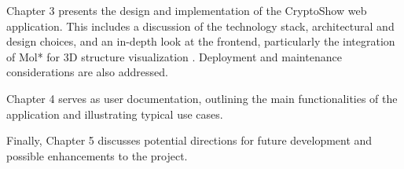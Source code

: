 Chapter 3 presents the design and implementation of the CryptoShow web application. This includes a discussion of the technology stack, architectural and design choices, and an in-depth look at the frontend, particularly the integration of Mol* for 3D structure visualization \cite{sehnal2021mol}. Deployment and maintenance considerations are also addressed.

Chapter 4 serves as user documentation, outlining the main functionalities of the application and illustrating typical use cases.

Finally, Chapter 5 discusses potential directions for future development and possible enhancements to the project.
